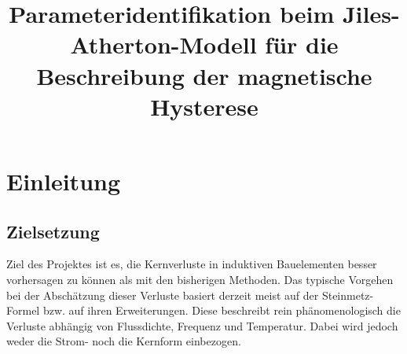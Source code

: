 \documentclass{scrartcl}
\begin{document}
\title{Parameteridentifikation beim Jiles-Atherton-Modell für die Beschreibung der magnetische Hysterese}
\tableofcontents
\newpage
\section{Einleitung}
\subsection{Zielsetzung}
Ziel des Projektes ist es, die Kernverluste in induktiven Bauelementen besser vorhersagen zu können als mit den bisherigen Methoden. Das typische Vorgehen bei der Abschätzung dieser Verluste basiert derzeit meist auf der Steinmetz-Formel bzw. auf ihren Erweiterungen. Diese beschreibt rein phänomenologisch die Verluste abhängig von Flussdichte, Frequenz und Temperatur. Dabei wird jedoch weder die Strom- noch die Kernform einbezogen.\\
\end{document}
